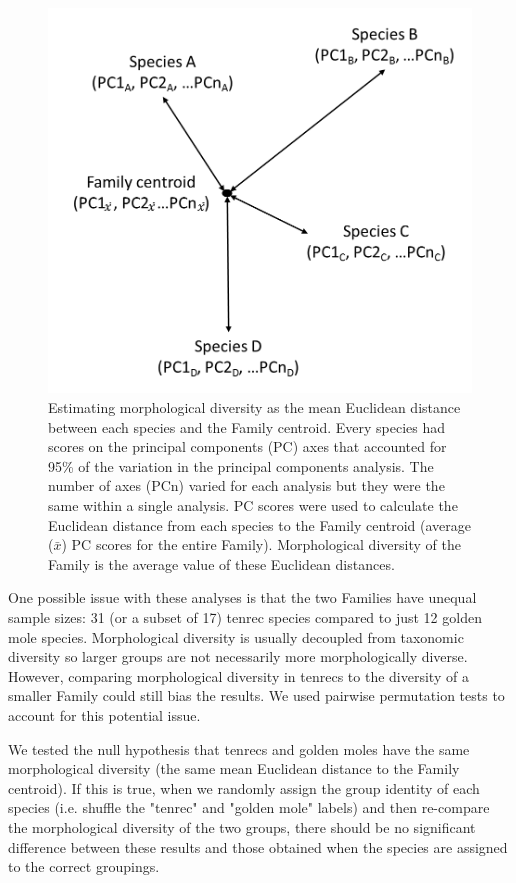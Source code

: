 \documentclass[12pt,a4paper]{article}
\begin{document}
	\begin{figure}[!htbp]
	\centering
	\includegraphics [width=0.7\linewidth, height=0.7\textheight, keepaspectratio]{figures/Centroids.png}
	\caption[Calculating diversity as mean Euclidean distance to Family centroid.]
		{Estimating morphological diversity as the mean Euclidean distance between each species and the Family centroid. Every species had scores on the principal components (PC) axes that accounted for 95\% of the variation in the principal components analysis. The number of axes (PCn) varied for each analysis but they were the same within a single analysis. PC scores were used to calculate the Euclidean distance from each species to the Family centroid (average (\begin{math}
			\bar{x}
			\end{math}) PC scores for the entire Family). Morphological diversity of the Family is the average value of these Euclidean distances.}
	\label{fig:centroids}
	\end{figure}	

	One possible issue with these analyses is that the two Families have unequal sample sizes: 31 (or a subset of 17) tenrec species compared to just 12 golden mole species. Morphological diversity is usually decoupled from taxonomic diversity \citep[e.g.][]{Ruta2013, Hopkins2013} so larger groups are not necessarily more morphologically diverse. However, comparing morphological diversity in tenrecs to the diversity of a smaller Family could still bias the results. We used pairwise permutation tests to account for this potential issue. 

	We tested the null hypothesis that tenrecs and golden moles have the same morphological diversity (the same mean Euclidean distance to the Family centroid). If this is true, when we randomly assign the group identity of each species (i.e. shuffle the "tenrec" and "golden mole" labels) and then re-compare the morphological diversity of the two groups, there should be no significant difference between these results and those obtained when the species are assigned to the correct groupings. 
	
\end{document}
